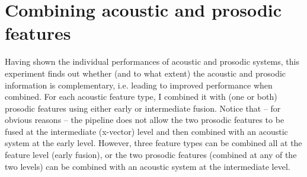 \documentclass[bsc,frontabs,twoside,singlespacing,parskip,deptreport]{infthesis}
\begin{document}
{{  }

  \section{Combining acoustic and prosodic features}{
    \label{sec:exp-acoustic+prosodic}

    Having shown the individual performances of acoustic and prosodic systems, this experiment finds out whether (and to what extent) the acoustic and prosodic information is complementary, i.e. leading to improved performance when combined. For each acoustic feature type, I combined it with (one or both) prosodic features using either early or intermediate fusion. Notice that -- for obvious reasons -- the pipeline does not allow the two prosodic features to be fused at the intermediate (x-vector) level and then combined with an acoustic system at the early level. However, three feature types can be combined all at the feature level (early fusion), or the two prosodic features (combined at any of the two levels) can be combined with an acoustic system at the intermediate level.

}}
\end{document}
